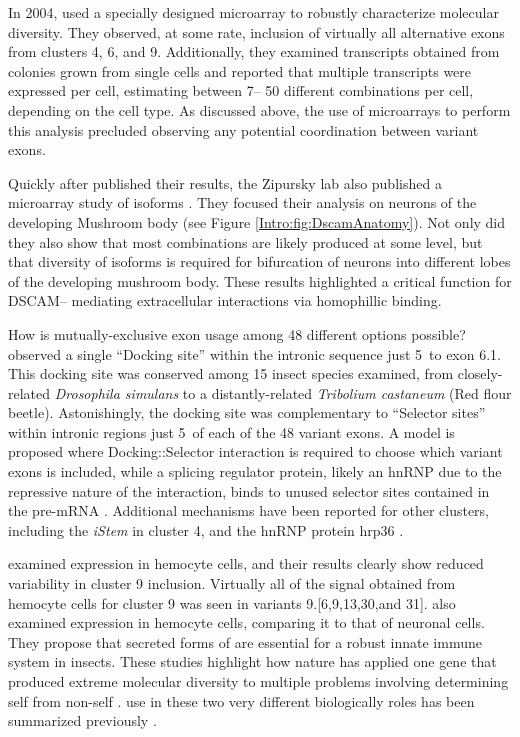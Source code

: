     In 2004, \citet{Neves2004} used a specially designed microarray to robustly characterize \dscam{} molecular diversity. They observed, at some rate, inclusion of virtually all alternative exons from clusters 4, 6, and 9. Additionally, they examined \dscam{} transcripts obtained from colonies grown from single cells and reported that multiple \dscam{} transcripts were expressed per cell, estimating between 7-- 50 different combinations per cell, depending on the cell type. As discussed above, the use of microarrays to perform this analysis precluded observing any potential coordination between variant exons.

    Quickly after \citet{Neves2004} published their results, the Zipursky lab also published a microarray study of \dscam{} isoforms \citep{Zhan2004}. They focused their analysis on neurons of the developing Mushroom body (see Figure \ref{Intro:fig:DscamAnatomy}). Not only did they also show that most \dscam{} combinations are likely produced at some level, but that diversity of isoforms is required for bifurcation of neurons into different lobes of the developing mushroom body. These results highlighted a critical function for DSCAM-- mediating extracellular interactions via homophillic binding.

    How is mutually-exclusive exon usage among 48 different options possible? \citet{Graveley2005b} observed a single ``Docking site'' within the intronic sequence just 5\textprime~to exon 6.1. This docking site was conserved among 15 insect species examined, from closely-related \textit{Drosophila simulans} to a distantly-related \textit{Tribolium castaneum} (Red flour beetle). Astonishingly, the docking site was complementary to ``Selector sites'' within intronic regions just 5\textprime~of each of the 48 variant exons. A model is proposed where Docking::Selector interaction is required to choose which variant exons is included, while a splicing regulator protein, likely an hnRNP due to the repressive nature of the interaction, binds to unused selector sites contained in the pre-mRNA \citep{Graveley2000}. Additional mechanisms have been reported for other clusters, including the \textit{iStem} \citep{Kreahling2005} in cluster 4, and the hnRNP protein hrp36 \citep{Olson2007}.

    \citep{Neves2004} examined \dscam{} expression in hemocyte cells, and their results clearly show reduced variability in cluster 9 inclusion. Virtually all of the signal obtained from hemocyte cells for cluster 9 was seen in variants 9.[6,9,13,30,and 31]. \citep{Watson2005} also examined \dscam{} expression in hemocyte cells, comparing it to that of neuronal cells. They propose that secreted forms of \dscam{} are essential for a robust innate immune system in insects. These studies highlight how nature has applied one gene that produced extreme molecular diversity to multiple problems involving determining self from non-self \citep{Shi2012a, Hattori2008}. \dscam{} use in these two very different biologically roles has been summarized previously \citep{Hemani2012}.

